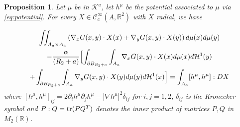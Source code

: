 \documentclass[12pt,reqno]{amsart}
\newtheorem{proposition}[theorem]{Proposition}
\def\C{{\mathcal C}}
\def \p {\partial}
\newcommand{\R}{\mathbb{R}}
\DeclareMathOperator \tr{\rm {tr}}
\numberwithin{equation}{section}
\begin{document}
\begin{proposition}\label{prop:stress_energy_tensor_divfree}
Let \(\mu\) be in \(\mathcal{K}^a\), let \(h^\mu\) be the potential associated to \(\mu\) via \eqref{eq:potential}. For every \(X\in \C^\infty_c(A,\R^2)\) with \(X\) radial, we have

\begin{multline}\label{eq:derivative_inner}
\iint_{A_a\times A_a} \left(\nabla_x G(x,y)\cdot X(x) + \nabla_y G(x,y)  \cdot X(y)\right) d\mu(x)d\mu(y) \\
-\frac{\alpha}{(R_2+a)} \Bigl[  \int_{\p B_{R_2+a}} \int_{A_a}\nabla_x G(x,y)\cdot X(x) d\mu(x) d\mathcal{H}^1(y) \\
+ \int_{\p B_{R_2+a}} \int_{A_a} \nabla_y G(x,y)\cdot X(y) d\mu(y) d\mathcal{H}^1(x)\Bigr] =\int_{A_a} [h^\mu,h^\mu]:DX
\end{multline}
where \( [h^\mu,h^\mu]_{ij}=2\p_ih^\mu\p_jh^\mu-|\nabla h^\mu|^2\delta_{ij}\) for \(i,j=1,2\), \(\delta_{ij}\) is the Kronecker symbol and \(P:Q=\tr (PQ^T)\) denotes the inner product of matrices \(P,Q\) in \(M_2(\R)\).
\end{proposition}
\end{document}
